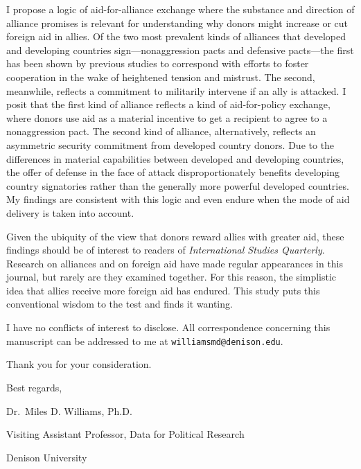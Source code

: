 \documentclass[
  11pt,
]{article}
\begin{document}
I propose a logic of aid-for-alliance exchange where the substance and
direction of alliance promises is relevant for understanding why donors
might increase or cut foreign aid in allies. Of the two most prevalent
kinds of alliances that developed and developing countries
sign---nonaggression pacts and defensive pacts---the first has been
shown by previous studies to correspond with efforts to foster
cooperation in the wake of heightened tension and mistrust. The second,
meanwhile, reflects a commitment to militarily intervene if an ally is
attacked. I posit that the first kind of alliance reflects a kind of
aid-for-policy exchange, where donors use aid as a material incentive to
get a recipient to agree to a nonaggression pact. The second kind of
alliance, alternatively, reflects an asymmetric security commitment from
developed country donors. Due to the differences in material
capabilities between developed and developing countries, the offer of
defense in the face of attack disproportionately benefits developing
country signatories rather than the generally more powerful developed
countries. My findings are consistent with this logic and even endure
when the mode of aid delivery is taken into account.

Given the ubiquity of the view that donors reward allies with greater
aid, these findings should be of interest to readers of
\emph{International Studies Quarterly}. Research on alliances and on
foreign aid have made regular appearances in this journal, but rarely
are they examined together. For this reason, the simplistic idea that
allies receive more foreign aid has endured. This study puts this
conventional wisdom to the test and finds it wanting.

I have no conflicts of interest to disclose. All correspondence
concerning this manuscript can be addressed to me at
\texttt{williamsmd@denison.edu}.

Thank you for your consideration.

Best regards,

Dr.~Miles D. Williams, Ph.D.

Visiting Assistant Professor, Data for Political Research

Denison University
\end{document}
